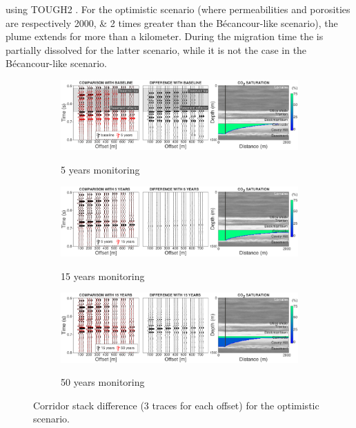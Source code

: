 \citet{TranNgoc2013} using TOUGH2 \citep{Pruess1999,Pruess2005}. For the
optimistic scenario (where permeabilities and porosities are respectively
\numlist{2000;2} times greater than the Bé\-can\-cour-like scenario), the plume
extends for more than a kilometer. During the migration time the  is
partially dissolved for the latter scenario, while it is not the case in the
Bé\-can\-cour-like scenario.
\begin{figure}[!ht]
        \centering
        \begin{subfigure}[b]{0.95\textwidth}
                \caption{5 years monitoring}
                \includegraphics[width=\textwidth]{fig/seism_opt_new_a.pdf}
                \label{fig:seism_opt_a}
        \end{subfigure}%

        \begin{subfigure}[b]{.95\textwidth}
                \caption{15 years monitoring}
                \includegraphics[width=\textwidth]{fig/seism_opt_new_b.pdf}
                \label{fig:seism_opt_b}
        \end{subfigure}

        \begin{subfigure}[b]{.95\textwidth}
                \caption{50 years monitoring}
                \includegraphics[width=\textwidth]{fig/seism_opt_new_c.pdf}
                \label{fig:seism_opt_c}
        \end{subfigure}

        \caption{Corridor stack difference (3 traces for each offset) for the
optimistic scenario.}
        \label{fig:seismopt}
\end{figure}

